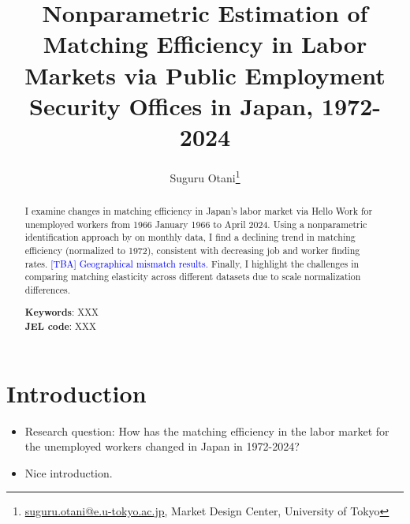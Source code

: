 \documentclass[12pt]{article}
\begin{document}
\title{Nonparametric Estimation of Matching Efficiency in Labor Markets via Public Employment Security Offices in Japan, 1972-2024}
\author{Suguru Otani\thanks{\href{mailto:}{suguru.otani@e.u-tokyo.ac.jp}, Market Design Center, University of Tokyo}}
\maketitle

\begin{abstract}
\noindent
I examine changes in matching efficiency in Japan's labor market via Hello Work for unemployed workers from 1966 January 1966 to April 2024. Using a nonparametric identification approach by \cite{lange2020beyond} on monthly data, I find a declining trend in matching efficiency (normalized to 1972), consistent with decreasing job and worker finding rates. \textcolor{blue}{[TBA] Geographical mismatch results.} Finally, I highlight the challenges in comparing matching elasticity across different datasets due to scale normalization differences.

\textbf{Keywords}: XXX \\
\textbf{JEL code}: XXX
\end{abstract}

\section{Introduction}

\begin{itemize}
    \item Research question: How has the matching efficiency in the labor market for the unemployed workers changed in Japan in 1972-2024?
    \item Nice introduction.
\end{itemize}
\end{document}
